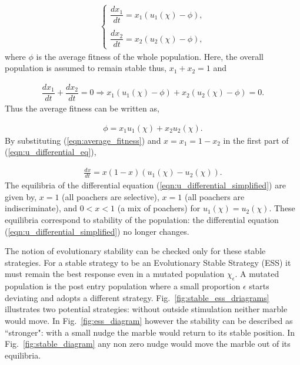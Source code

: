 \documentclass[10pt]{article}
\begin{document}
\begin{eqnarray}
    \label{eqn:u_differential_eq}
    \left\{
    \begin{array}{cl}
    \dfrac{dx_1}{dt}=x_1(u_1(\chi)-\phi),
    \\
    \\
    \dfrac{dx_2}{dt}= x_2(u_2(\chi)-\phi),
    \end{array} \right.
\end{eqnarray}
where $\phi$ is the average fitness of the whole population. Here, the overall population is assumed to remain stable thus, \(x_1 + x_2 = 1 \)
and

\begin{eqnarray}
    \dfrac{dx_1}{dt}  + \dfrac{dx_2}{dt} = 0 \Rightarrow x_1(u_1(\chi) - \phi)
     + x_2(u_2(\chi) - \phi)=0.
\end{eqnarray} %
Thus the average fitness can be written as,

\begin{eqnarray}
\label{eqn:average_fitness}
    \phi=x_1u_1(\chi) + x_2u_2(\chi).
\end{eqnarray}
By substituting (\ref{eqn:average_fitness}) and \(x=x_1= 1 - x_2\) 
in the first part of (\ref{eqn:u_differential_eq}),

\begin{eqnarray}
    \label{eqn:u_differential_simplified}
    \frac{dx}{dt}= x(1 - x)(u_1(\chi) - u_2(\chi)).
\end{eqnarray}
The equilibria of the differential equation (\ref{eqn:u_differential_simplified})
are given by, \(x=1\) (all poachers are selective), \(x=1\) (all poachers are indiscriminate), and \(0<x<1\) (a mix of poachers) for \(u_1(\chi)=u_2(\chi)\).
These equilibria correspond to stability of the population: the differential 
equation (\ref{eqn:u_differential_simplified}) no longer changes. 

The notion of evolutionary stability can be checked only for these stable strategies.
For a stable strategy to be an Evolutionary Stable Strategy (ESS) it must remain 
the best response even in a mutated population \(\chi_\epsilon\). A mutated population 
is the post entry population 
where a small proportion \(\epsilon\) starts deviating and adopts a different strategy.
Fig.~\ref{fig:stable_ess_driagrams} illustrates two potential strategies: without 
outside stimulation neither marble would move. In Fig.~\ref{fig:ess_diagram}
however the stability can be described as ``stronger": with a small nudge the marble
would return to its stable position. In Fig.~\ref{fig:stable_diagram} any non zero
nudge would move the marble out of its equilibria.
\end{document}
